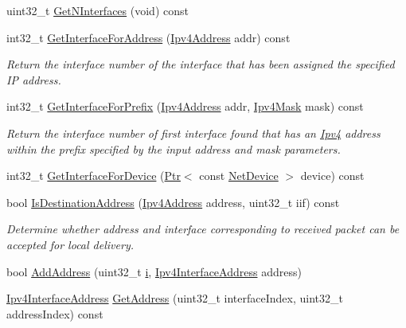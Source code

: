 \begin{DoxyCompactItemize}
uint32\+\_\+t \hyperlink{classns3_1_1Ipv4L3Protocol_a6ab2be11c0df97f2d1170bbc737c9628}{Get\+N\+Interfaces} (void) const 
\item 
int32\+\_\+t \hyperlink{classns3_1_1Ipv4L3Protocol_a8aac475db90ce304c53b23c2d470f6eb}{Get\+Interface\+For\+Address} (\hyperlink{classns3_1_1Ipv4Address}{Ipv4\+Address} addr) const 
\begin{DoxyCompactList}\small\item\em Return the interface number of the interface that has been assigned the specified IP address. \end{DoxyCompactList}\item 
int32\+\_\+t \hyperlink{classns3_1_1Ipv4L3Protocol_aedf0ed801978ecf18b1e8ae0d0039a42}{Get\+Interface\+For\+Prefix} (\hyperlink{classns3_1_1Ipv4Address}{Ipv4\+Address} addr, \hyperlink{classns3_1_1Ipv4Mask}{Ipv4\+Mask} mask) const 
\begin{DoxyCompactList}\small\item\em Return the interface number of first interface found that has an \hyperlink{classns3_1_1Ipv4}{Ipv4} address within the prefix specified by the input address and mask parameters. \end{DoxyCompactList}\item 
int32\+\_\+t \hyperlink{classns3_1_1Ipv4L3Protocol_a4640baab6b3879020a4146f17e293321}{Get\+Interface\+For\+Device} (\hyperlink{classns3_1_1Ptr}{Ptr}$<$ const \hyperlink{classns3_1_1NetDevice}{Net\+Device} $>$ device) const 
\item 
bool \hyperlink{classns3_1_1Ipv4L3Protocol_a2d76dcdc0c915346d9177afda3b4e388}{Is\+Destination\+Address} (\hyperlink{classns3_1_1Ipv4Address}{Ipv4\+Address} address, uint32\+\_\+t iif) const 
\begin{DoxyCompactList}\small\item\em Determine whether address and interface corresponding to received packet can be accepted for local delivery. \end{DoxyCompactList}\item 
bool \hyperlink{classns3_1_1Ipv4L3Protocol_a6392fb16c03883eb3e21c9ac4216967d}{Add\+Address} (uint32\+\_\+t \hyperlink{lte__uplink__power__control_8m_a6f6ccfcf58b31cb6412107d9d5281426}{i}, \hyperlink{classns3_1_1Ipv4InterfaceAddress}{Ipv4\+Interface\+Address} address)
\item 
\hyperlink{classns3_1_1Ipv4InterfaceAddress}{Ipv4\+Interface\+Address} \hyperlink{classns3_1_1Ipv4L3Protocol_a85fa4287313a773dee29aa73fa74a7e0}{Get\+Address} (uint32\+\_\+t interface\+Index, uint32\+\_\+t address\+Index) const 

\end{DoxyCompactItemize}
